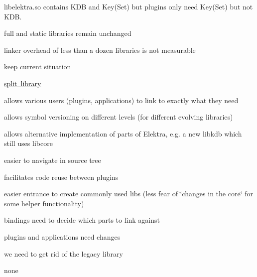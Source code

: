 libelektra.\+so contains K\+DB and Key(\+Set) but plugins only need Key(\+Set) but not K\+DB.


\begin{DoxyItemize}
\item full and static libraries remain unchanged
\end{DoxyItemize}


\begin{DoxyItemize}
\item linker overhead of less than a dozen libraries is not measurable
\end{DoxyItemize}


\begin{DoxyItemize}
\item keep current situation
\end{DoxyItemize}


\begin{DoxyItemize}
\item \mbox{\hyperlink{src_libs_README_md}{split library}}
\end{DoxyItemize}


\begin{DoxyItemize}
\item allows various users (plugins, applications) to link to exactly what they need
\item allows symbol versioning on different levels (for different evolving libraries)
\item allows alternative implementation of parts of Elektra, e.\+g. a new libkdb which still uses libcore
\item easier to navigate in source tree
\item facilitates code reuse between plugins
\item easier entrance to create commonly used libs (less fear of \char`\"{}changes in the core\char`\"{} for some helper functionality)
\end{DoxyItemize}


\begin{DoxyItemize}
\item bindings need to decide which parts to link against
\item plugins and applications need changes
\item we need to get rid of the legacy library
\end{DoxyItemize}


\begin{DoxyItemize}
\item none
\end{DoxyItemize}



